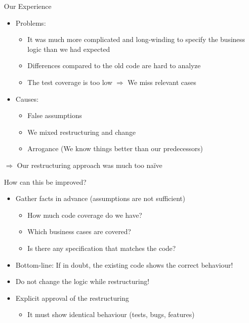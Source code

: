 \begin{frame}[fragile]{Our Experience}
\begin{itemize}
\item Problems:
\begin{itemize}
\item It was much more complicated and long-winding to specify the business logic than we had expected
\item Differences compared to the old code are hard to analyze
\item The test coverage is too low \newline $\Rightarrow$ We miss relevant cases 
\end{itemize}
\end{itemize}

\begin{itemize}
\item Causes:
\begin{itemize}
\item False assumptions
\item We mixed restructuring and change
\item Arrogance (\glqq We know things better than our predecessors\grqq{})
\end{itemize}
\end{itemize}

$\Rightarrow$ Our restructuring approach was much too na\"ive

\end{frame}


\begin{frame}[fragile]{How can this be improved?}
\begin{itemize}
\item Gather facts in advance (assumptions are not sufficient)
\begin{itemize}
\item How much code coverage do we have?
\item Which business cases are covered?
\item Is there any specification that matches the code?
\end{itemize}

\item Bottom-line: If in doubt, the existing code shows the correct behaviour!

\item Do not change the logic while restructuring!

\item Explicit approval of the restructuring
\begin{itemize}
\item It must show identical behaviour (tests, bugs, features)
\end{itemize}

\end{itemize}
\end{frame}



